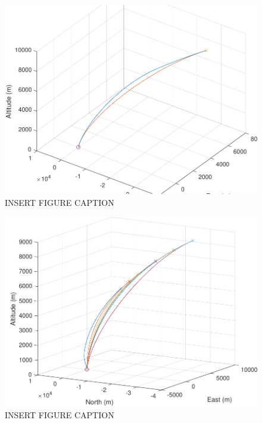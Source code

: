 \begin{figure}[H]
	\centering
	\begin{minipage}{4.5 in}
		\includegraphics[width=\linewidth]{Figures/trajatmovsvac.pdf}
		\caption{INSERT FIGURE CAPTION \label{fig:trajatmovsvac} }
	\end{minipage}
\end{figure}



\begin{figure}[H]
	\centering
	\begin{minipage}{4.5 in}
		\includegraphics[width=\linewidth]{Figures/trajpowatmo.pdf}
		\caption{INSERT FIGURE CAPTION \label{fig:trajpowatmo} }
	\end{minipage}
\end{figure}




